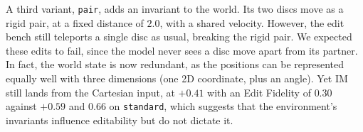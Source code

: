 \documentclass{article} %
\newcommand{\heatTint}{60}
\newcommand{\heatbg}[3]{%
  \pgfmathsetmacro{\heatT}{max(0,min(1,((0#3)-(#1))/((#2)-(#1))))}%
  \ifdim\heatT pt<0.5pt
    \pgfmathsetmacro{\heatP}{200*\heatT}\edef\heatCol{heatMid!\heatP!heatLo}%
  \else
    \pgfmathsetmacro{\heatP}{200*\heatT-100}\edef\heatCol{heatHi!\heatP!heatMid}%
  \fi
  \edef\heatDo{\noexpand\cellcolor{\heatCol!\heatTint!white}}\heatDo}
\newcommand{\dg}{\ensuremath{^{\dagger}}}
\def\heatparse#1\dg#2\heatstop{\def\heatnum{#1}}
\newcommand{\heatcell}[3]{%
  \heatparse#3\dg\heatstop
  \heatbg{#1}{#2}{\heatnum}#3}
\newcommand{\heatcellmath}[3]{%
  \heatparse#3\dg\heatstop
  \heatbg{#1}{#2}{\heatnum}$#3$}
\begin{document}
A third variant, \texttt{pair}, adds an invariant to the world. Its two discs move as a rigid pair, at a fixed distance of $2.0$, with a shared velocity. However, the edit bench still teleports a single disc as usual, breaking the rigid pair. We expected these edits to fail, since the model never sees a disc move apart from its partner. In fact, the world state is now redundant, as the positions can be represented equally well with three dimensions (one 2D coordinate, plus an angle). Yet IM still lands from the Cartesian input, at $+0.41$ with an Edit Fidelity of $0.30$ against $+0.59$ and $0.66$ on \texttt{standard}, which suggests that the environment's invariants influence editability but do not dictate it.

%
\end{document}
